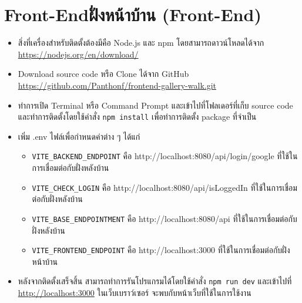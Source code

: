 \section{\ifenglish Front-End\else ฝั่งหน้าบ้าน (Front-End)\fi}
\begin{itemize}
    \item สิ่งที่เครื่องสำหรับติดตั้งต้องมีคือ Node.js และ npm โดยสามารถดาวน์โหลดได้จาก \url{https://nodejs.org/en/download/}
    \item Download source code หรือ Clone ได้จาก GitHub \url{https://github.com/Panthonf/frontend-gallery-walk.git}
    \item ทำการเปิด Terminal หรือ Command Prompt และเข้าไปที่โฟลเดอร์ที่เก็บ source code และทำการติดตั้งโดยใช้คำสั่ง \texttt{npm install} เพื่อทำการติดตั้ง package ที่จำเป็น
    \item เพิ่ม .env ไฟล์เพื่อกำหนดค่าต่าง ๆ ได้แก่
          \begin{itemize}
              \item \texttt{VITE\_BACKEND\_ENDPOINT} คือ http://localhost:8080/api/login/google ที่ใช้ในการเชื่อมต่อกับฝั่งหลังบ้าน
              \item \texttt{VITE\_CHECK\_LOGIN} คือ http://localhost:8080/api/isLoggedIn ที่ใช้ในการเชื่อมต่อกับฝั่งหลังบ้าน
              \item \texttt{VITE\_BASE\_ENDPOINTMENT} คือ http://localhost:8080/api ที่ใช้ในการเชื่อมต่อกับฝั่งหลังบ้าน
              \item \texttt{VITE\_FRONTEND\_ENDPOINT} คือ http://localhost:3000 ที่ใช้ในการเชื่อมต่อกับฝั่งหน้าบ้าน
          \end{itemize}
    \item หลังจากติดตั้งเสร็จสิ้น สามารถทำการรันโปรแกรมได้โดยใช้คำสั่ง \texttt{npm run dev} และเข้าไปที่ \url{http://localhost:3000} ในเว็บเบราว์เซอร์ จะพบกับหน้าเว็บที่ใช้ในการใช้งาน
\end{itemize}

